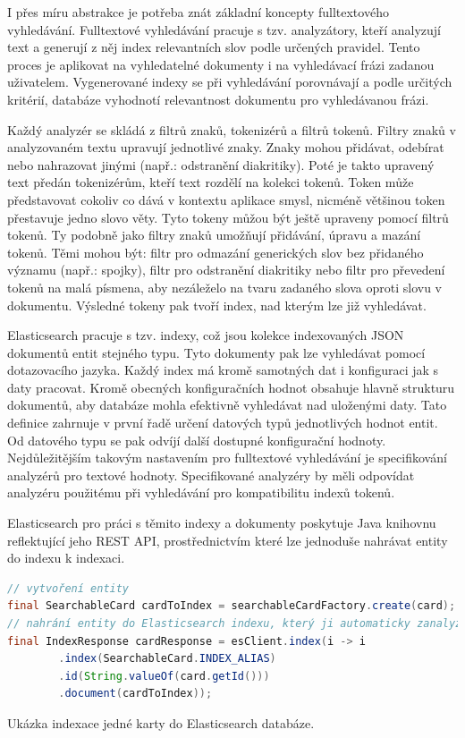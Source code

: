\begin{itemize}
\begin{itemize}
		I přes míru abstrakce je potřeba znát základní koncepty fulltextového vyhledávání.
		Fulltextové vyhledávání pracuje s tzv. analyzátory, kteří analyzují text a generují z něj index relevantních
		slov podle určených pravidel.
		Tento proces je aplikovat na vyhledatelné dokumenty i na vyhledávací frázi zadanou uživatelem.
		Vygenerované indexy se při vyhledávání porovnávají a podle určitých kritérií, databáze vyhodnotí relevantnost
		dokumentu pro vyhledávanou frázi. \cite{index_search_analysis}

		Každý analyzér se skládá z filtrů znaků, tokenizérů a filtrů tokenů.
		Filtry znaků v analyzovaném textu upravují jednotlivé znaky.
		Znaky mohou přidávat, odebírat nebo nahrazovat jinými (např.: odstranění diakritiky).
		Poté je takto upravený text předán tokenizérům, kteří text rozdělí na kolekci tokenů.
		Token může představovat cokoliv co dává v kontextu aplikace smysl, nicméně většinou token přestavuje jedno
		slovo věty.
		Tyto tokeny můžou být ještě upraveny pomocí filtrů tokenů.
		Ty podobně jako filtry znaků umožňují přidávání, úpravu a mazání tokenů.
		Těmi mohou být: filtr pro odmazání generických slov bez přidaného významu (např.: spojky), filtr pro odstranění
		diakritiky nebo filtr pro převedení tokenů na malá písmena, aby nezáleželo na tvaru zadaného slova oproti slovu
		v dokumentu.
		Výsledné tokeny pak tvoří index, nad kterým lze již vyhledávat.
		\cite{analyzer_anatomy}

		Elasticsearch pracuje s tzv. indexy, což jsou kolekce indexovaných \ac{JSON} dokumentů entit stejného typu.
		Tyto dokumenty pak lze vyhledávat pomocí dotazovacího jazyka.
		Každý index má kromě samotných dat i konfiguraci jak s daty pracovat.
		Kromě obecných konfiguračních hodnot obsahuje hlavně strukturu dokumentů, aby databáze mohla efektivně vyhledávat
		nad uloženými daty.
		Tato definice zahrnuje v první řadě určení datových typů jednotlivých hodnot entit.
		Od datového typu se pak odvíjí další dostupné konfigurační hodnoty.
		Nejdůležitějším takovým nastavením pro fulltextové vyhledávání je specifikování analyzérů pro textové hodnoty.
		Specifikované analyzéry by měli odpovídat analyzéru použitému při vyhledávání pro kompatibilitu indexů tokenů.

		Elasticsearch pro práci s těmito indexy a dokumenty poskytuje Java knihovnu reflektující jeho \ac{REST} \ac{API},
		prostřednictvím které lze jednoduše nahrávat entity do indexu k indexaci.

		\begin{lstlisting}[language=Java]
// vytvoření entity
final SearchableCard cardToIndex = searchableCardFactory.create(card);
// nahrání entity do Elasticsearch indexu, který ji automaticky zanalyzuje
final IndexResponse cardResponse = esClient.index(i -> i
		.index(SearchableCard.INDEX_ALIAS)
		.id(String.valueOf(card.getId()))
		.document(cardToIndex));
		\end{lstlisting}
		Ukázka indexace jedné karty do Elasticsearch databáze. %


\end{itemize}
\end{itemize}
